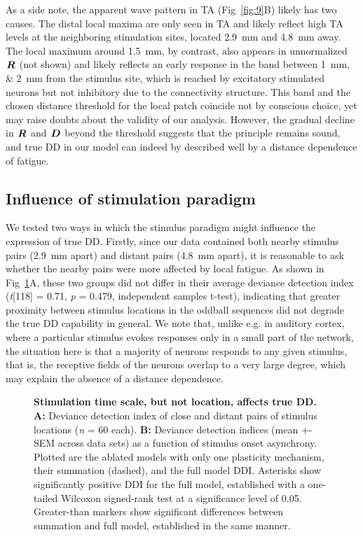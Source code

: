 \documentclass[10pt,letterpaper]{article}
\newcommand{\dev}{\textit{A-as-dev}}
\newcommand{\msc}{\textit{A-in-con}}
\newcommand{\std}{\textit{A-as-std}}
\newcommand{\ifstringequal}[4]{%
  \ifnum\pdfstrcmp{#1}{#2}=0
  #3%
  \else
  #4%
  \fi
}
\newcommand{\seqreplace}[1]{\ifstringequal{dev}{#1}{\dev}{%
    \ifstringequal{std}{#1}{\std}{%
        \ifstringequal{msc}{#1}{\msc}{#1}%
    }%
}}
\newcommand{\R}[3][]{{}^{\seqreplace{#1}}_{}\boldsymbol R^{#2}_{#3}}
\newcommand{\D}[3][]{{}^{\seqreplace{#1}}_{}\boldsymbol D^{#2}_{#3}}
\newcommand{\FIG}[1]{Fig~\ref{fig:#1}}
\newcommand{\statistic}[2]{\textit{#1} = \num{#2}}
\begin{document}
As a side note, the apparent wave pattern in TA (\FIG{9}B) likely has two causes. The distal local maxima are only seen in TA and likely reflect high TA levels at the neighboring stimulation sites, located \qty{2.9}{\milli\meter} and \qty{4.8}{\milli\meter} away. The local maximum around \qty{1.5}{\milli\meter}, by contrast, also appears in unnormalized $\R{}{}$ (not shown) and likely reflects an early response in the band between \qtylist{1;2}{\milli\meter} from the stimulus site, which is reached by excitatory stimulated neurons but not inhibitory due to the connectivity structure. This band and the chosen distance threshold for the local patch coincide not by conscious choice, yet may raise doubts about the validity of our analysis. However, the gradual decline in $\R{}{}$ and $\D{}{}$ beyond the threshold suggests that the principle remains sound, and true DD in our model can indeed by described well by a distance dependence of fatigue.

\subsection*{Influence of stimulation paradigm}

We tested two ways in which the stimulus paradigm might influence the expression of true DD. Firstly, since our data contained both nearby stimulus pairs (\qty{2.9}{\milli\meter} apart) and distant pairs (\qty{4.8}{\milli\meter} apart), it is reasonable to ask whether the nearby pairs were more affected by local fatigue. As shown in \FIG{10}A, these two groups did not differ in their average deviance detection index (\textit{t}[118] = \num{0.71}, \statistic{p}{0.479}, independent samples t-test), indicating that greater proximity between stimulus locations in the oddball sequences did not degrade the true DD capability in general.
We note that, unlike e.g. in auditory cortex, where a particular stimulus evokes responses only in a small part of the network, the situation here is that a majority of neurons responds to any given stimulus, that is, the receptive fields of the neurons overlap to a very large degree, which may explain the absence of a distance dependence.

\begin{figure}[!h]
    \caption{%
        \textbf{Stimulation time scale, but not location, affects true DD.}
        \textbf{A:} Deviance detection index of close and distant pairs of stimulus locations (\statistic{n}{60} each).
        \textbf{B:} Deviance detection indices (mean +- SEM across data sets) as a function of stimulus onset asynchrony. Plotted are the ablated models with only one plasticity mechanism, their summation (dashed), and the full model DDI. Asterisks show significantly positive DDI for the full model, established with a one-tailed Wilcoxon signed-rank test at a significance level of 0.05. Greater-than markers show significant differences between summation and full model, established in the same manner.
    }
    \label{fig:10}
\end{figure}
\end{document}
